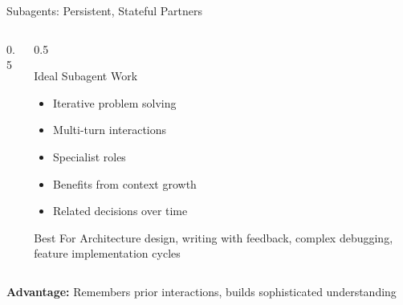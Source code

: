 \documentclass[aspectratio=169,11pt]{beamer}
\begin{document}
\begin{frame}{Subagents: Persistent, Stateful Partners}
\begin{columns}[T]
\begin{column}{0.5\textwidth}
\begin{center}
\end{center}
\end{column}
\begin{column}{0.5\textwidth}
\begin{block}{Ideal Subagent Work}
\begin{itemize}
    \item Iterative problem solving
    \item Multi-turn interactions
    \item Specialist roles
    \item Benefits from context growth
    \item Related decisions over time
\end{itemize}
\end{block}

\begin{exampleblock}{Best For}
Architecture design, writing with feedback, complex debugging, feature implementation cycles
\end{exampleblock}
\end{column}
\end{columns}

\vspace{0.2cm}
\textbf{Advantage:} Remembers prior interactions, builds sophisticated understanding
\end{frame}
\end{document}
